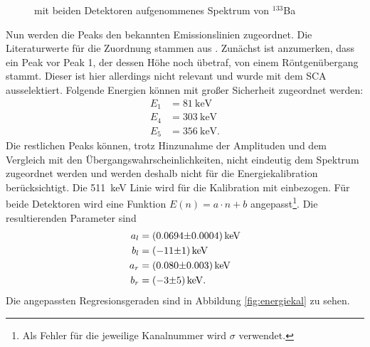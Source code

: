 \begin{figure}[h!]
\begin{subfigure}[h]{0.5\textwidth}
    \label{fig:ba_kal_rechts}
  \end{subfigure}
  \caption{mit beiden Detektoren aufgenommenes Spektrum von $^{133}$Ba}
  \label{fig:ba_kal}
\end{figure}

Nun werden die Peaks den bekannten Emissionslinien zugeordnet. Die Literaturwerte für die Zuordnung stammen aus \cite{baspektrum}. Zunächst ist anzumerken, dass ein Peak vor Peak 1, der dessen Höhe noch übetraf, von einem Röntgenübergang stammt. Dieser ist hier allerdings nicht relevant und wurde mit dem SCA ausselektiert. Folgende Energien können mit großer Sicherheit zugeordnet werden:
\begin{align*}
  E_1&=\SI{81}{\kilo\electronvolt}\\
  E_4&=\SI{303}{\kilo\electronvolt}\\
  E_5&=\SI{356}{\kilo\electronvolt}.
\end{align*}
Die restlichen Peaks können, trotz Hinzunahme der Amplituden und dem Vergleich mit den Übergangswahrscheinlichkeiten, nicht eindeutig dem Spektrum zugeordnet werden und werden deshalb nicht für die Energiekalibration berücksichtigt. Die \SI{511}{\kilo\electronvolt} Linie wird für die Kalibration mit einbezogen. Für beide Detektoren wird eine Funktion $E(n)=a\cdot n+b$ angepasst\footnote{Als Fehler für die jeweilige Kanalnummer wird $\sigma$ verwendet.}. Die resultierenden Parameter sind
\begin{align*}
  a_l&=\SI[separate-uncertainty=true]{0.0694 \pm 0.0004}{\kilo\electronvolt}\\
  b_l&=\SI[separate-uncertainty=true]{-11 \pm 1}{\kilo\electronvolt}\\
  a_r&=\SI[separate-uncertainty=true]{0,080 \pm 0,003}{\kilo\electronvolt}\\
  b_r&=\SI[separate-uncertainty=true]{-3 \pm 5}{\kilo\electronvolt}.
\end{align*}
Die angepassten Regresionsgeraden sind in Abbildung \ref{fig:energiekal} zu sehen.
